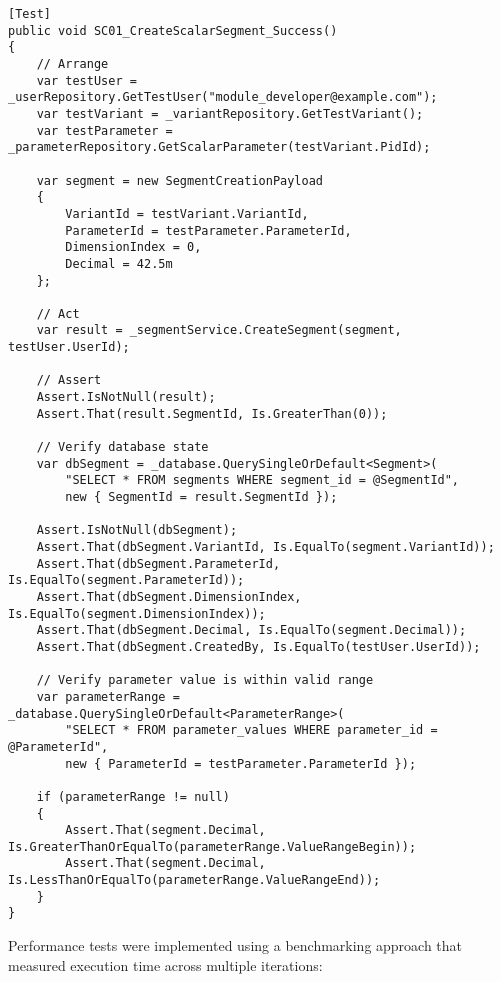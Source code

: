 \begin{lstlisting}[language=CSharp, caption={Segment Modification Test Implementation Example}, label={lst:segment-modification-test}]
[Test]
public void SC01_CreateScalarSegment_Success()
{
    // Arrange
    var testUser = _userRepository.GetTestUser("module_developer@example.com");
    var testVariant = _variantRepository.GetTestVariant();
    var testParameter = _parameterRepository.GetScalarParameter(testVariant.PidId);
    
    var segment = new SegmentCreationPayload
    {
        VariantId = testVariant.VariantId,
        ParameterId = testParameter.ParameterId,
        DimensionIndex = 0,
        Decimal = 42.5m
    };
    
    // Act
    var result = _segmentService.CreateSegment(segment, testUser.UserId);
    
    // Assert
    Assert.IsNotNull(result);
    Assert.That(result.SegmentId, Is.GreaterThan(0));
    
    // Verify database state
    var dbSegment = _database.QuerySingleOrDefault<Segment>(
        "SELECT * FROM segments WHERE segment_id = @SegmentId", 
        new { SegmentId = result.SegmentId });
    
    Assert.IsNotNull(dbSegment);
    Assert.That(dbSegment.VariantId, Is.EqualTo(segment.VariantId));
    Assert.That(dbSegment.ParameterId, Is.EqualTo(segment.ParameterId));
    Assert.That(dbSegment.DimensionIndex, Is.EqualTo(segment.DimensionIndex));
    Assert.That(dbSegment.Decimal, Is.EqualTo(segment.Decimal));
    Assert.That(dbSegment.CreatedBy, Is.EqualTo(testUser.UserId));
    
    // Verify parameter value is within valid range
    var parameterRange = _database.QuerySingleOrDefault<ParameterRange>(
        "SELECT * FROM parameter_values WHERE parameter_id = @ParameterId", 
        new { ParameterId = testParameter.ParameterId });
    
    if (parameterRange != null)
    {
        Assert.That(segment.Decimal, Is.GreaterThanOrEqualTo(parameterRange.ValueRangeBegin));
        Assert.That(segment.Decimal, Is.LessThanOrEqualTo(parameterRange.ValueRangeEnd));
    }
}
\end{lstlisting}

Performance tests were implemented using a benchmarking approach that measured execution time across multiple iterations:

